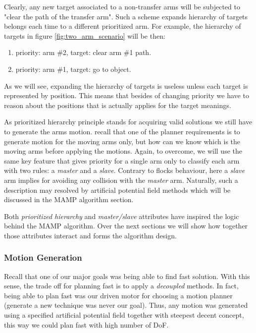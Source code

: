 \documentclass[english]{article}
\theoremstyle{definition}
\begin{document}
Clearly, any new target associated to a non-transfer arms will be subjected to "clear the path of the transfer arm". Such a scheme expands hierarchy of targets belongs each time to a different prioritized arm. For example, the hierarchy of targets in figure \ref{fig:two_arm_scenario} will be then:
\begin{enumerate}
\item priority: arm \#2, target: clear arm \#1 path.
\item priority: arm \#1, target: go to object.
\end{enumerate}
As we will see, expanding the hierarchy of targets is useless unless each target is represented by position. This means that besides of changing priority we have to reason about the positions that is actually applies for the target meanings.

As prioritized hierarchy principle stands for acquiring valid solutions we still have to generate the arms motion. recall that one of the planner requirements is to generate motion for the moving arms only, but how can we know which is the moving arms before applying the motions. Again, to overcome, we will use the same key feature that gives priority for a single arm only to classify each arm with two rules: a \textit{master} and a \textit{slave}. Contrary to flocks behaviour, here a \textit{slave} arm implies for avoiding any collision with the \textit{master} arm. Naturally, such a description may resolved by artificial potential field methods which will be discussed in the MAMP algorithm section. 

Both \textit{prioritized hierarchy} and \textit{master/slave} attributes have inspired the logic behind the MAMP algorithm. Over the next sections we will show how together those attributes interact and forms the algorithm design.


\subsubsection*{Motion Generation}

Recall that one of our major goals was being able to find fast solution. With this sense, the trade off for planning fast is to apply a \textit{decoupled} methods. In fact, being able to plan fast was our driven motor for choosing a motion planner (generate a new technique was never our goal). Thus, any motion was generated using a specified artificial potential field together with steepest decent concept, this way we could plan fast with high number of DoF.
\end{document}
